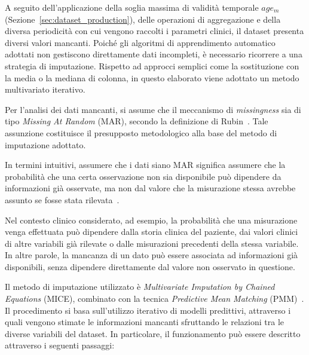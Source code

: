 \documentclass[a4paper,12pt]{report}
\begin{document}
A seguito dell'applicazione della soglia massima di validità temporale \(age_m\) (Sezione~\ref{sec:dataset_production}), delle operazioni di aggregazione e della diversa periodicità con cui vengono raccolti i parametri clinici, il dataset presenta diversi valori mancanti. Poiché gli algoritmi di apprendimento automatico adottati non gestiscono direttamente dati incompleti, è necessario ricorrere a una strategia di imputazione. Rispetto ad approcci semplici come la sostituzione con la media o la mediana di colonna, in questo elaborato viene adottato un metodo multivariato iterativo.

Per l'analisi dei dati mancanti, si assume che il meccanismo di \textit{missingness} sia di tipo \textit{Missing At Random} (MAR), secondo la definizione di Rubin~\cite{10.1093/biomet/63.3.581}. Tale assunzione costituisce il presupposto metodologico alla base del metodo di imputazione adottato.

In termini intuitivi, assumere che i dati siano MAR significa assumere che la probabilità che una certa osservazione non sia disponibile può dipendere da informazioni già osservate, ma non dal valore che la misurazione stessa avrebbe assunto se fosse stata rilevata~\cite{10.1093/biomet/63.3.581}.

Nel contesto clinico considerato, ad esempio, la probabilità che una misurazione venga effettuata può dipendere dalla storia clinica del paziente, dai valori clinici di altre variabili già rilevate o dalle misurazioni precedenti della stessa variabile. In altre parole, la mancanza di un dato può essere associata ad informazioni già disponibili, senza dipendere direttamente dal valore non osservato in questione. 

Il metodo di imputazione utilizzato è \textit{Multivariate Imputation by Chained Equations} (MICE), combinato con la tecnica \textit{Predictive Mean Matching} (PMM)~\cite{MICEINR}. Il procedimento si basa sull'utilizzo iterativo di modelli predittivi, attraverso i quali vengono stimate le informazioni mancanti sfruttando le relazioni tra le diverse variabili del dataset. In particolare, il funzionamento può essere descritto attraverso i seguenti passaggi:
\end{document}
